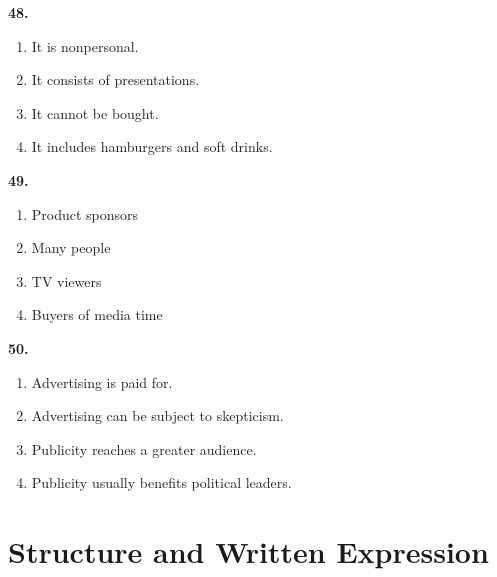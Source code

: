 \documentclass[12pt]{article}
\begin{document}
\noindent\textbf{48.}
\begin{enumerate}[label=(\Alph*),leftmargin=*,itemsep=0.2em]
\item It is nonpersonal.
\item It consists of presentations.
\item It cannot be bought.
\item It includes hamburgers and soft drinks.
\end{enumerate}
\par
\vspace{0.25\baselineskip}
\noindent\textbf{49.}
\begin{enumerate}[label=(\Alph*),leftmargin=*,itemsep=0.2em]
\item Product sponsors
\item Many people
\item TV viewers
\item Buyers of media time
\end{enumerate}
\par
\vspace{0.25\baselineskip}
\noindent\textbf{50.}
\begin{enumerate}[label=(\Alph*),leftmargin=*,itemsep=0.2em]
\item Advertising is paid for.
\item Advertising can be subject to skepticism.
\item Publicity reaches a greater audience.
\item Publicity usually benefits political leaders.
\end{enumerate}
\par
\vspace{0.25\baselineskip}
\section*{Structure and Written Expression}
\end{document}
